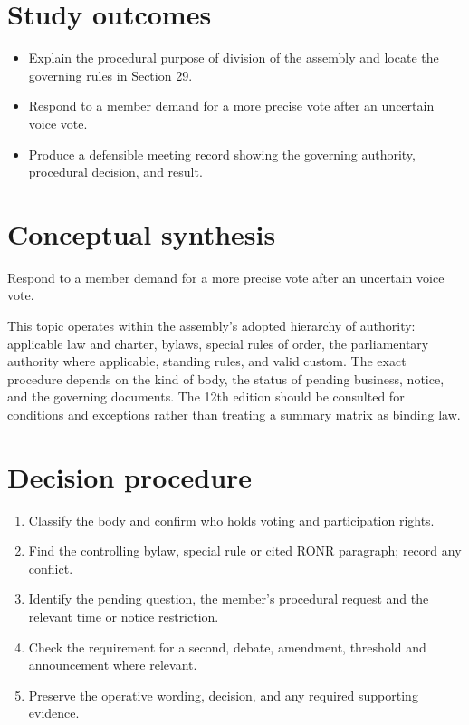 \documentclass[11pt]{article}
\begin{document}
\SuiteOpen
{}
\section{Study outcomes}
\begin{itemize}[leftmargin=*,itemsep=4pt]
\item Explain the procedural purpose of division of the assembly and locate the governing rules in Section 29.
\item Respond to a member demand for a more precise vote after an uncertain voice vote.
\item Produce a defensible meeting record showing the governing authority, procedural decision, and result.
\end{itemize}

\section{Conceptual synthesis}
Respond to a member demand for a more precise vote after an uncertain voice vote.

This topic operates within the assembly’s adopted hierarchy of authority: applicable law and charter, bylaws, special rules of order, the parliamentary authority where applicable, standing rules, and valid custom. The exact procedure depends on the kind of body, the status of pending business, notice, and the governing documents. The 12th edition should be consulted for conditions and exceptions rather than treating a summary matrix as binding law.
\section{Decision procedure}
\begin{enumerate}[leftmargin=*,itemsep=4pt]
\item Classify the body and confirm who holds voting and participation rights.
\item Find the controlling bylaw, special rule or cited RONR paragraph; record any conflict.
\item Identify the pending question, the member’s procedural request and the relevant time or notice restriction.
\item Check the requirement for a second, debate, amendment, threshold and announcement where relevant.
\item Preserve the operative wording, decision, and any required supporting evidence.
\end{enumerate}
\end{document}
